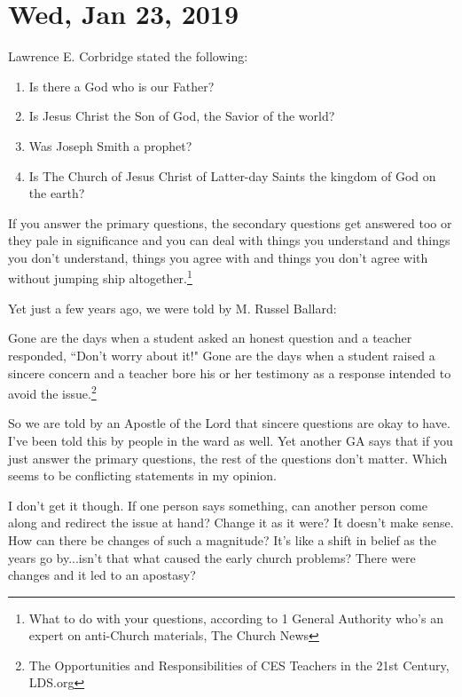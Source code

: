 \section{Wed, Jan 23, 2019}

Lawrence E. Corbridge stated the following:

\begin{displayquote}
\begin{enumerate}
\item Is there a God who is our Father?
\item Is Jesus Christ the Son of God, the Savior of the world?
\item Was Joseph Smith a prophet?
\item Is The Church of Jesus Christ of Latter-day Saints the kingdom of God on the 
earth?
\end{enumerate}

If you answer the primary questions, the secondary questions get answered too or they 
pale in significance and you can deal with things you understand and things you don’t 
understand, things you agree with and things you don’t agree with without jumping 
ship altogether.\footnote{What to do with your questions, according to 1 General 
Authority who's an expert on anti-Church materials, The Church News}
\end{displayquote}

Yet just a few years ago, we were told by M. Russel Ballard:

\begin{displayquote}

Gone are the days when a student asked an honest question and a teacher responded, 
``Don’t worry about it!" Gone are the days when a student raised a sincere concern 
and a teacher bore his or her testimony as a response intended to avoid the 
issue.\footnote{The Opportunities and Responsibilities of CES Teachers in the 21st 
Century, LDS.org}
\end{displayquote}

So we are told by an Apostle of the Lord that sincere questions are okay to have.
I've been told this by people in the ward as well. Yet another GA says that if you
just answer the primary questions, the rest of the questions don't matter. Which
seems to be conflicting statements in my opinion.

I don't get it though. If one person says something, can another person come along
and redirect the issue at hand? Change it as it were? It doesn't make sense. How can
there be changes of such a magnitude? It's like a shift in belief as the years go
by...isn't that what caused the early church problems? There were changes and it led
to an apostasy?